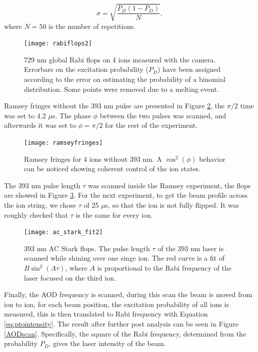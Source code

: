 \begin{equation}
\label{errorequation}
\sigma = \sqrt{\frac{P_{D}(1-P_{D})}{N}},
\end{equation}
where $N = 50$ is the number of repetitions.
\begin{figure}
\centering
\texttt{[image: rabiflops2]}
\caption{729 nm global Rabi flops on 4 ions measured with the camera. Errorbars on the excitation probability ($P_D$) have been assigned according to the error on estimating the probability of a binomial distribution. Some points were removed due to a melting event.}
\label{rabiflops4}
\end{figure}
Ramsey fringes without the 393 nm pulse are presented in Figure \ref{ramseyfringes}, the $\pi/2$ time was set to 4.2 $\mu$s. The phase $\phi$ between the two pulses was scanned, and afterwards it was set to $\phi = \pi/2$ for the rest of the experiment.
\begin{figure}[H]
\centering
\texttt{[image: ramseyfringes]}
\caption{Ramsey fringes for 4 ions without 393 nm. A $\cos^2(\phi)$ behavior can be noticed showing coherent control of the ion states.}
\label{ramseyfringes}
\end{figure}
The 393 nm pulse length $\tau$ was scanned inside the Ramsey experiment, the flops are showed in Figure \ref{ACscan}. For the next experiment, to get the beam profile across the ion string, we chose $\tau$ of 25 $\mu$s, so that the ion is not fully flipped. It was roughly checked that $\tau$ is the same for every ion.
\begin{figure}[H]
\centering
\texttt{[image: ac\_stark\_fit2]}
\caption{393 nm AC Stark flops. The pulse length $\tau$ of the 393 nm laser is scanned while shining over one singe ion. The red curve is a fit of $B\sin^2(A\tau)$, where $A$ is proportional to the Rabi frequency of the laser focused on the third ion.}
\label{ACscan}
\end{figure}
Finally, the AOD frequency is scanned, during this scan the beam is moved from ion to ion, for each beam position, the excitation probability of all ions is measured, this is then translated to Rabi frequency with Equation \eqref{eq:ptointensity}. The result after further post analysis can be seen in Figure \ref{AODscan}. Specifically, the square of the Rabi frequency, determined from the probability $P_D$, gives the laser intensity of the beam.

